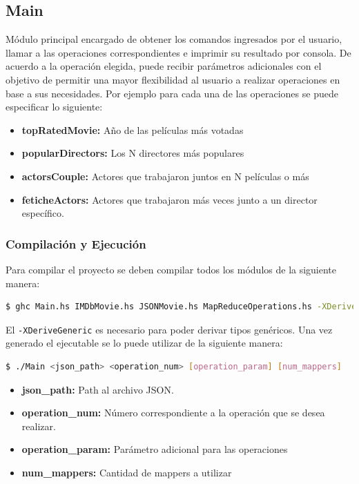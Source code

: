 \documentclass[a4paper,11pt]{article}
\begin{document}
\subsection{Main}

Módulo principal encargado de obtener los comandos ingresados por el usuario, llamar a las operaciones correspondientes e imprimir su resultado por consola. De acuerdo a la operación elegida, puede recibir parámetros adicionales con el objetivo de permitir una mayor flexibilidad al usuario a realizar operaciones en base a sus necesidades. Por ejemplo para cada una de las operaciones se puede especificar lo siguiente:

\begin{itemize}
	\item \textbf{topRatedMovie:} Año de las películas más votadas
	\item \textbf{popularDirectors:} Los N directores más populares
	\item \textbf{actorsCouple:} Actores que trabajaron juntos en N películas o más
	\item \textbf{feticheActors:} Actores que trabajaron más veces junto a un director específico.
\end{itemize}

\subsubsection{Compilación y Ejecución}
Para compilar el proyecto se deben compilar todos los módulos de la siguiente manera:
	\begin{lstlisting}[language=bash]
  $ ghc Main.hs IMDbMovie.hs JSONMovie.hs MapReduceOperations.hs -XDeriveGeneric
	\end{lstlisting}
  
El \texttt{-XDeriveGeneric} es necesario para poder derivar tipos genéricos. Una vez generado el ejecutable se lo puede utilizar de la siguiente manera:


  	\begin{lstlisting}[language=bash]
  $ ./Main <json_path> <operation_num> [operation_param] [num_mappers]
    \end{lstlisting}
    
\begin{itemize}
	\item \textbf{json\_path:} Path al archivo JSON.
	\item \textbf{operation\_num:} Número correspondiente a la operación que se desea realizar.
	\item \textbf{operation\_param:} Parámetro adicional para las operaciones
	\item \textbf{num\_mappers:} Cantidad de mappers a utilizar
\end{itemize}
  
\end{document}
